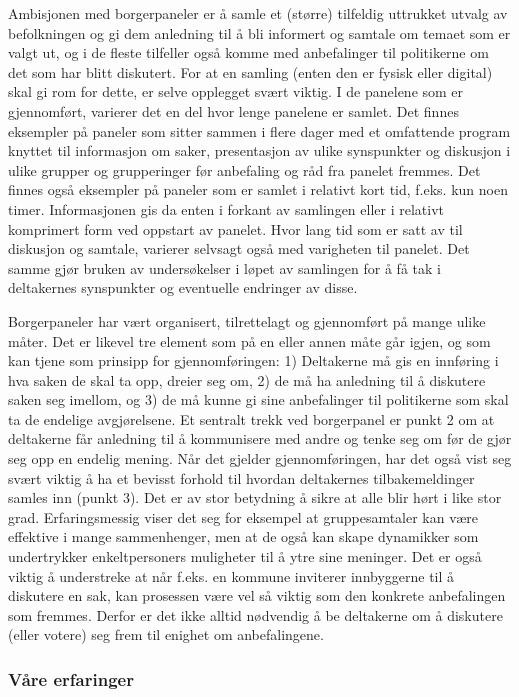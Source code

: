 \documentclass[
  12pt,
  a4paper, 12pt]{article}
\begin{document}
Ambisjonen med borgerpaneler er å samle et (større) tilfeldig uttrukket utvalg av befolkningen og gi dem anledning til å bli informert og samtale om temaet som er valgt ut, og i de fleste tilfeller også komme med anbefalinger til politikerne om det som har blitt diskutert. For at en samling (enten den er fysisk eller digital) skal gi rom for dette, er selve opplegget svært viktig. I de panelene som er gjennomført, varierer det en del hvor lenge panelene er samlet. Det finnes eksempler på paneler som sitter sammen i flere dager med et omfattende program knyttet til informasjon om saker, presentasjon av ulike synspunkter og diskusjon i ulike grupper og grupperinger før anbefaling og råd fra panelet fremmes. Det finnes også eksempler på paneler som er samlet i relativt kort tid, f.eks. kun noen timer. Informasjonen gis da enten i forkant av samlingen eller i relativt komprimert form ved oppstart av panelet. Hvor lang tid som er satt av til diskusjon og samtale, varierer selvsagt også med varigheten til panelet. Det samme gjør bruken av undersøkelser i løpet av samlingen for å få tak i deltakernes synspunkter og eventuelle endringer av disse.

Borgerpaneler har vært organisert, tilrettelagt og gjennomført på mange ulike måter. Det er likevel tre element som på en eller annen måte går igjen, og som kan tjene som prinsipp for gjennomføringen: 1) Deltakerne må gis en innføring i hva saken de skal ta opp, dreier seg om, 2) de må ha anledning til å diskutere saken seg imellom, og 3) de må kunne gi sine anbefalinger til politikerne som skal ta de endelige avgjørelsene. Et sentralt trekk ved borgerpanel er punkt 2 om at deltakerne får anledning til å kommunisere med andre og tenke seg om før de gjør seg opp en endelig mening. Når det gjelder gjennomføringen, har det også vist seg svært viktig å ha et bevisst forhold til hvordan deltakernes tilbakemeldinger samles inn (punkt 3). Det er av stor betydning å sikre at alle blir hørt i like stor grad. Erfaringsmessig viser det seg for eksempel at gruppesamtaler kan være effektive i mange sammenhenger, men at de også kan skape dynamikker som undertrykker enkeltpersoners muligheter til å ytre sine meninger. Det er også viktig å understreke at når f.eks. en kommune inviterer innbyggerne til å diskutere en sak, kan prosessen være vel så viktig som den konkrete anbefalingen som fremmes. Derfor er det ikke alltid nødvendig å be deltakerne om å diskutere (eller votere) seg frem til enighet om anbefalingene.

\hypertarget{vuxe5re-erfaringer-4}{%
\subsubsection{Våre erfaringer}\label{vuxe5re-erfaringer-4}}
\end{document}

